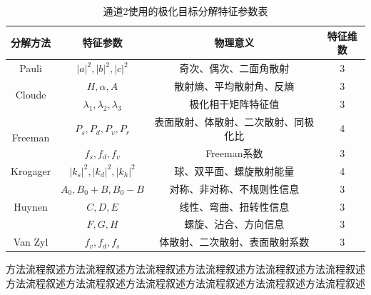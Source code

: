 \begin{table}[ht!]
    \caption{通道2使用的极化目标分解特征参数表}
    \label{tab:decomposition_features}
    \centering
    \begin{tabular}{cccc}
        \toprule[1.5bp]
        分解方法                     & 特征参数                                                             & 物理意义               & 特征维数 \\
        \midrule[0.75bp]
        Pauli                    & $\left| a \right|^2,\left| b \right|^2,\left| c \right|^2$
                                 & 奇次、偶次、二面角散射                                                      & 3                         \\
        \multirow{2}{*}{Cloude}  & $H,\alpha,A$                                                     & 散射熵、平均散射角、反熵       & 3    \\
                                 & $\lambda_1,\lambda_2,\lambda_3$                                  & 极化相干矩阵特征值          & 3    \\
        \multirow{2}{*}{Freeman} & $P_s,P_d,P_v,P_r$                                                & 表面散射、体散射、二次散射、同极化比 & 4    \\
                                 & $f_s,f_d,f_v$                                                    & Freeman系数          & 3    \\
        Krogager                 & $\left| k_s \right|^2,\left| k_d \right|^2,\left| k_h \right|^2$ & 球、双平面、螺旋散射能量       & 4    \\
        \multirow{3}{*}{Huynen}  & $A_0,B_0+B,B_0-B$                                                & 对称、非对称、不规则性信息      & 3    \\
                                 & $C,D,E$                                                          & 线性、弯曲、扭转性信息        & 3    \\
                                 & $F,G,H$                                                          & 螺旋、沾合、方向信息         & 3    \\
        Van Zyl                  & $f_v,f_d,f_s$                                                    & 体散射、二次散射、表面散射系数    & 3    \\
        \bottomrule[1.5bp]
    \end{tabular}
\end{table}

方法流程叙述方法流程叙述方法流程叙述方法流程叙述方法流程叙述方法流程叙述方法流程叙述方法流程叙述方法流程叙述方法流程叙述方法流程叙述方法流程叙述

